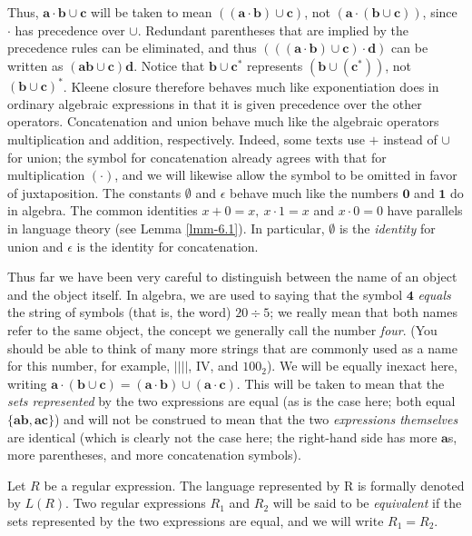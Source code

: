 Thus, $\pmb{a}\cdot\pmb{b}\cup\pmb{c}$ will be taken to mean $((\pmb{a}\cdot
\pmb{b})\cup\pmb{c})$, not $(\pmb{a}\cdot(\pmb{b}\cup\pmb{c}))$, since $\cdot$
has precedence over $\cup$. Redundant parentheses that are implied by the
precedence rules can be eliminated, and thus $(((\pmb{a}\cdot\pmb{b})\cup\pmb{c})
\cdot\pmb{d})$ can be written as $(\pmb{ab}\cup\pmb{c})\pmb{d}$. Notice that
$\pmb{b}\cup\pmb{c}^*$ represents $(\pmb{b}\cup(\pmb{c}^*))$, not $(\pmb{b}\cup
\pmb{c})^*$. Kleene closure therefore behaves much like exponentiation does in
ordinary algebraic expressions in that it is given precedence over the other
operators. Concatenation and union behave much like the algebraic operators
multiplication and addition, respectively. Indeed, some texts use $+$ instead of
$\cup$ for union; the symbol for concatenation already agrees with that for
multiplication $(\cdot)$, and we will likewise allow the symbol to be omitted
in favor of juxtaposition. The constants $\emptyset$ and $\epsilon$ behave much
like the numbers $\pmb{0}$ and $\pmb{1}$ do in algebra. The common identities
$x+0=x,\ x\cdot 1=x$ and $x\cdot 0=0$ have parallels in language theory (see
Lemma \ref{lmm-6.1}). In particular,
$\emptyset$ is the \emph{identity} for union and $\epsilon$
is the identity for concatenation.

Thus far we have been very careful to distinguish between the name of an object
and the object itself. In algebra, we are used to saying that the symbol
$\pmb{4}$ \emph{equals} the string of symbols (that is, the word) $20 \div 5$; we
really mean that both names refer to the same object, the concept we generally
call the number \emph{four}. (You should be able to think of many more strings
that are commonly used as a name for this number, for example, $||||$, IV, and
$100_2$). We will be equally inexact here, writing $\pmb{a}\cdot(\pmb{b}\cup
\pmb{c})=(\pmb{a}\cdot\pmb{b})\cup(\pmb{a}\cdot\pmb{c})$. This will be taken to
mean that the \emph{sets represented} by the two expressions are equal (as is
the case here; both equal $\{\pmb{ab},\pmb{ac}\}$) and will not be construed to
mean that the two \emph{expressions themselves} are identical (which is clearly
not the case here; the right-hand side has more $\pmb{a}$s, more parentheses, and
more concatenation symbols).

\begin{dfn}\label{dfn-6.3}
Let $R$ be a regular expression. The language represented by R is formally
denoted by $L(R)$. Two regular expressions $R_1$ and $R_2$ will be said to be
\emph{equivalent} if the sets represented by the two expressions are
equal, and we will write $R_1 = R_2$.
\end{dfn}

